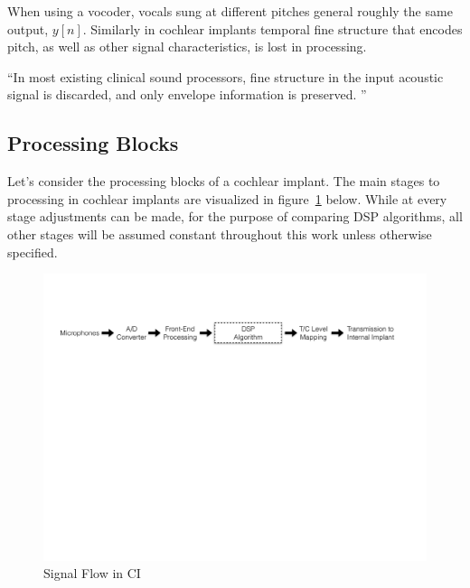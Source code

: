 \documentclass [11pt, proquest] {uwthesis}[2015/03/03]
\begin{document}
When using a vocoder, vocals sung at different pitches general roughly the same output, $y[n]$.  Similarly in cochlear implants temporal fine structure that encodes pitch, as well as other signal characteristics, is lost in processing.

``In most existing clinical sound processors, fine structure in the input acoustic signal is discarded, and only envelope information is preserved. ''  %


\subsection{Processing Blocks}

Let's consider the processing blocks of a cochlear implant.  The main stages to processing in cochlear implants are visualized in figure~\ref{fig:CI_signal_flow} below.  While at every stage adjustments can be made, for the purpose of comparing DSP algorithms, all other stages will be assumed constant throughout this work unless otherwise specified.

\begin{figure}[!ht]
  \centering
    \includegraphics[width=1.0\textwidth]{CI_Signal_Flow}   
    \caption{Signal Flow in CI}\label{fig:CI_signal_flow}
\end{figure}
\end{document}
